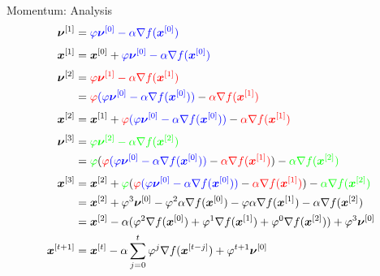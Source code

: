\documentclass[11pt,compress,t,notes=noshow, xcolor=table]{beamer}
\begin{document}
\begin{framev}[fs=footnotesize]{Momentum: Analysis}
\begin{equation*}
\begin{aligned}
\bm{\nu}^{[1]} &= \textcolor{blue}{\varphi \bm{\nu}^{[0]} - \alpha \nabla f(\bm{x}^{[0]})} \\[0.1cm]
\bm{x}^{[1]} &= \bm{x}^{[0]} + \textcolor{blue}{\varphi \bm{\nu}^{[0]} - \alpha \nabla f(\bm{x}^{[0]})} \\[0.1cm]
\bm{\nu}^{[2]} &= \textcolor{red}{\varphi \bm{\nu}^{[1]} - \alpha \nabla f(\bm{x}^{[1]})} \\
&= \textcolor{red}{\varphi} \textcolor{blue}{(\varphi \bm{\nu}^{[0]} - \alpha \nabla f(\bm{x}^{[0]}))} - \textcolor{red}{\alpha \nabla f(\bm{x}^{[1]})} \\[0.1cm]
\bm{x}^{[2]} &= \bm{x}^{[1]} +\textcolor{red}{\varphi} \textcolor{blue}{(\varphi \bm{\nu}^{[0]} - \alpha \nabla f(\bm{x}^{[0]}))} - \textcolor{red}{\alpha \nabla f(\bm{x}^{[1]})} \\[0.1cm]
\bm{\nu}^{[3]} &= \textcolor{green}{\varphi \bm{\nu}^{[2]} - \alpha \nabla f(\bm{x}^{[2]})} \\
&= \textcolor{green}{\varphi} (\textcolor{red}{\varphi} \textcolor{blue}{(\varphi \bm{\nu}^{[0]} - \alpha \nabla f(\bm{x}^{[0]}))} - \textcolor{red}{\alpha \nabla f(\bm{x}^{[1]})}) - \textcolor{green}{\alpha \nabla f(\bm{x}^{[2]})} \\[0.1cm]
\bm{x}^{[3]} &= \bm{x}^{[2]} + \textcolor{green}{\varphi} (\textcolor{red}{\varphi} \textcolor{blue}{(\varphi \bm{\nu}^{[0]} - \alpha \nabla f(\bm{x}^{[0]}))} - \textcolor{red}{\alpha \nabla f(\bm{x}^{[1]})}) - \textcolor{green}{\alpha \nabla f(\bm{x}^{[2]})}  \\
&= \bm{x}^{[2]} + \varphi^3\bm{\nu}^{[0]} - \varphi^2\alpha\nabla f(\bm{x}^{[0]}) - \varphi \alpha \nabla f(\bm{x}^{[1]}) - \alpha \nabla f(\bm{x}^{[2]}) \\
&= \bm{x}^{[2]} - \alpha(\varphi^2 \nabla f(\bm{x}^{[0]}) + \varphi^1 \nabla f(\bm{x}^{[1]}) + \varphi^0 \nabla f(\bm{x}^{[2]})) + \varphi^3 \bm{\nu}^{[0]} \\
\bm{x}^{[t+1]} &= \bm{x}^{[t]} - \alpha \displaystyle\sum_{j = 0}^{t} \varphi^j \nabla f(\bm{x}^{[t-j]}) + \varphi^{t+1}\bm{\nu}^{[0]}
\end{aligned}
\end{equation*}
\end{framev}
\end{document}
